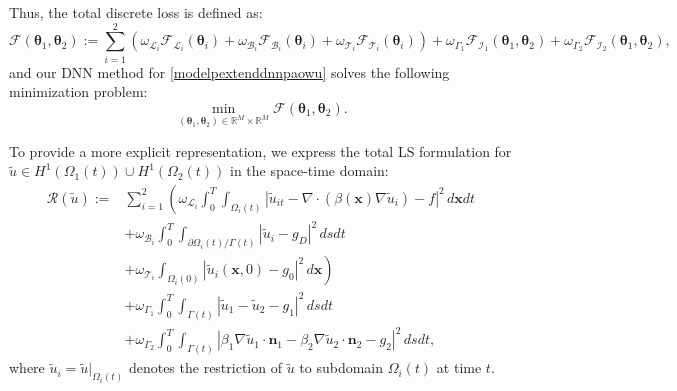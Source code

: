 \documentclass{article}
\begin{document}
Thus, the total discrete loss is defined as:
$$
\mathcal{F}(\boldsymbol{\theta}_1, \boldsymbol{\theta}_2) := \sum_{i=1}^{2} \left(\omega_{\mathcal{L}_i} \mathcal{F}_{\mathcal{L}_i}(\boldsymbol{\theta}_i) + \omega_{\mathcal{B}_i} \mathcal{F}_{\mathcal{B}_i}(\boldsymbol{\theta}_i) + \omega_{\mathcal{T}_i} \mathcal{F}_{\mathcal{T}_i}(\boldsymbol{\theta}_i)\right) + \omega_{\Gamma_1} \mathcal{F}_{\mathcal{I}_1}(\boldsymbol{\theta}_1, \boldsymbol{\theta}_2) + \omega_{\Gamma_2} \mathcal{F}_{\mathcal{I}_2}(\boldsymbol{\theta}_1, \boldsymbol{\theta}_2),
$$
and our DNN method for \eqref{modelpextenddnnpaowu} solves the following minimization problem:
$$
\min_{(\boldsymbol{\theta}_1, \boldsymbol{\theta}_2) \in \mathbb{R}^M \times \mathbb{R}^M} \mathcal{F}(\boldsymbol{\theta}_1, \boldsymbol{\theta}_2).
$$

To provide a more explicit representation, we express the total LS formulation for $\tilde{u} \in H^1(\Omega_1(t)) \cup H^1(\Omega_2(t))$ in the space-time domain:
\begin{equation}
    \begin{aligned}
\mathcal{R}(\tilde{u}) := &\sum_{i=1}^{2} \left(\omega_{\mathcal{L}_i} \int_{0}^{T}\int_{\Omega_i(t)} \left|\tilde{u}_{it} - \nabla \cdot (\beta(\boldsymbol{x}) \nabla \tilde{u}_{i}) - f\right|^2 \, d\boldsymbol{x}dt \right.\\
&\left.+ \omega_{\mathcal{B}_i} \int_{0}^{T}\int_{\partial \Omega_i(t) / \Gamma(t)} \left|\tilde{u}_i - g_D\right|^2 \, dsdt \right.\\
&\left. + \omega_{\mathcal{T}_i} \int_{\Omega_i(0)} \left|\tilde{u}_i(\boldsymbol{x},0) - g_0\right|^2 \, d\boldsymbol{x}\right) \\
&+ \omega_{\Gamma_1} \int_{0}^{T}\int_{\Gamma(t)} \left|\tilde{u}_1 - \tilde{u}_2 - g_1\right|^2 \, dsdt \\
&+ \omega_{\Gamma_2} \int_{0}^{T}\int_{\Gamma(t)} \left|\beta_1 \nabla \tilde{u}_1 \cdot \boldsymbol{n}_1 - \beta_2 \nabla \tilde{u}_2 \cdot \boldsymbol{n}_2 - g_2\right|^2 \, dsdt,
\end{aligned}
\end{equation}
where $\tilde{u}_i = \tilde{u}|_{\Omega_i(t)}$ denotes the restriction of $\tilde{u}$ to subdomain $\Omega_i(t)$ at time $t$.
\end{document}

